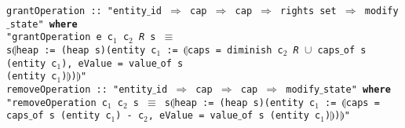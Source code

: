     {	
	\texttt{grantOperation :: "entity$\_$id $\Rightarrow$ cap $\Rightarrow$ cap $\Rightarrow$ rights set $\Rightarrow$ modify$\_$state" \textbf{where} \\
  "grantOperation e c$_1$ c$_2$ \textit{R} s $\equiv$ \\
  s$\llparenthesis$heap := (heap s)(entity c$_1$ := $\llparenthesis$caps = {diminish c$_2$ \textit{R}} $\cup$ caps$\_$of s (entity c$_1$), eValue = value$\_$of s \\(entity c$_1$)$\rrparenthesis$)$\rrparenthesis$"}}\\ 
  
   {	
	\texttt{removeOperation :: "entity$\_$id $\Rightarrow$ cap $\Rightarrow$ cap $\Rightarrow$ modify$\_$state" \textbf{where} \\
  "removeOperation c$_1$ c$_2$ s $\equiv$ s$\llparenthesis$heap := (heap s)(entity c$_1$ := $\llparenthesis$caps = caps$\_$of s (entity c$_1$) - {c$_2$}, eValue = value$\_$of s (entity c$_1$)$\rrparenthesis$)$\rrparenthesis$"}}\\ 
  
